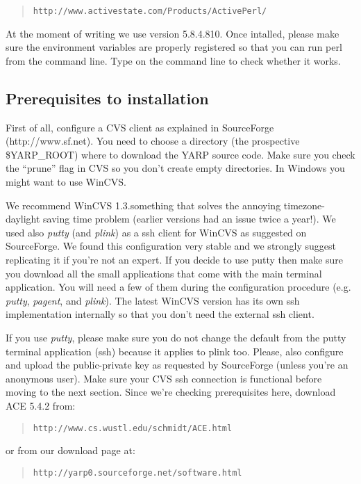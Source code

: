 \begin{quote}
{\tt http://www.activestate.com/Products/ActivePerl/}
\end{quote}

At the moment of writing we use version 5.8.4.810. Once intalled, please make sure the environment variables are properly registered so that you can run perl from the command line.
Type  on the command line to check whether it works.

\subsection{Prerequisites to installation}

First of all, configure a CVS client as explained in SourceForge (http://www.sf.net).
You need to choose a directory (the prospective \$YARP\_ROOT) where to download the
YARP source code. Make sure you check the ``prune'' flag in CVS so you don't create
empty directories. In Windows you might want to use WinCVS.

We recommend WinCVS 1.3.something that solves the annoying timezone-daylight saving time
problem (earlier versions had an issue twice a year!). We used also {\em putty} (and {\em plink}) as a ssh client for WinCVS as suggested on SourceForge. We found this configuration very stable and we strongly suggest replicating it if you're not an expert. 
If you decide to use putty then make sure you download all the small applications that come with the main terminal application. You will need a few of them during the configuration procedure (e.g. {\em putty}, {\em pagent}, and {\em plink}). The latest WinCVS version has its own ssh implementation internally so that you don't need the external ssh client.

If you use {\em putty}, please make sure you do not change the default from the putty terminal application (ssh)
because it applies to plink too. Please, also configure and upload the public-private key as requested by SourceForge (unless you're an anonymous user). Make sure your CVS ssh connection is functional before moving to the next section. Since we're checking prerequisites here, download ACE 5.4.2 from:

\begin{quote}
{\tt http://www.cs.wustl.edu/schmidt/ACE.html}
\end{quote}

or from our download page at:
\begin{quote}
{\tt http://yarp0.sourceforge.net/software.html}
\end{quote}

